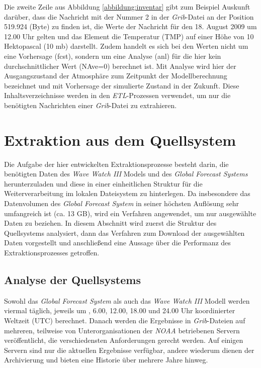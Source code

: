 Die zweite Zeile aus Abbildung \ref{abbildung:inventar} gibt zum
Beispiel Auskunft darüber, dass die Nachricht mit der Nummer 2 in der
\textit{Grib}-Datei an der Position 519.924 (Byte) zu finden ist, die
Werte der Nachricht für den 18. August 2009 um 12.00 Uhr gelten und
das Element die Temperatur (TMP) auf einer Höhe von 10 Hektopascal (10
mb) darstellt. Zudem handelt es sich bei den Werten nicht um eine
Vorhersage (fcst), sondern um eine Analyse (anl) für die hier kein
durchschnittlicher Wert (NAve=0) berechnet ist. Mit Analyse wird hier
der Ausgangszustand der Atmosphäre zum Zeitpunkt der Modellberechnung
bezeichnet und mit Vorhersage der simulierte Zustand in der
Zukunft. Diese Inhaltsverzeichnisse werden in den
\textit{ETL}-Prozessen verwendet, um nur die benötigten Nachrichten
einer \textit{Grib}-Datei zu extrahieren.

\section{Extraktion aus dem Quellsystem}
Die Aufgabe der hier entwickelten Extraktionsprozesse besteht darin,
die benötigten Daten des \textit{Wave Watch III} Models und des
\textit{Global Forecast Systems} herunterzuladen und diese in einer
einheitlichen Struktur für die Weiterverarbeitung im lokalen
Dateisystem zu hinterlegen. Da insbesondere das Datenvolumen des
\textit{Global Forecast System} in seiner höchsten Auflösung sehr
umfangreich ist (ca. 13 GB), wird ein Verfahren angewendet, um nur
ausgewählte Daten zu beziehen. In diesem Abschnitt wird zuerst die
Struktur des Quellsystems analysiert, dann das Verfahren zum Download
der ausgewählten Daten vorgestellt und anschließend eine Aussage über
die Performanz des Extraktionsprozesses getroffen.

\subsection{Analyse der Quellsystems}
Sowohl das \textit{Global Forecast System} als auch das \textit{Wave
  Watch III} Modell werden viermal täglich, jeweils um , 6.00, 12.00,
18.00 und 24.00 Uhr koordinierter Weltzeit (UTC) berechnet. Danach
werden die Ergebnisse in \textit{Grib}-Dateien auf mehreren, teilweise
von Unterorganisationen der \textit{NOAA} betriebenen Servern
veröffentlicht, die verschiedensten Anforderungen gerecht werden. Auf
einigen Servern sind nur die aktuellen Ergebnisse verfügbar, andere
wiederum dienen der Archivierung und bieten eine Historie über mehrere
Jahre hinweg.

